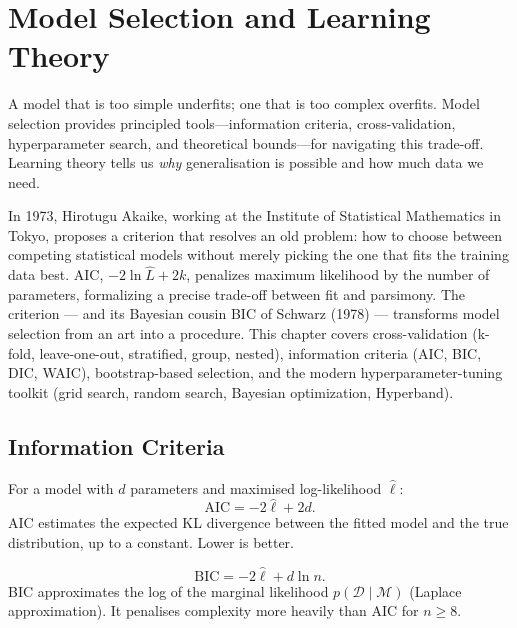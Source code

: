 \chapter{Model Selection and Learning Theory}
\label{ch:selection}

\begin{intuition}[title=\textbf{Choosing the Right Model}]
A model that is too simple underfits; one that is too complex overfits. Model selection provides principled tools---information criteria, cross-validation, hyperparameter search, and theoretical bounds---for navigating this trade-off. Learning theory tells us \emph{why} generalisation is possible and how much data we need.
\end{intuition}

In 1973, Hirotugu Akaike, working at the Institute of Statistical Mathematics in Tokyo, proposes a criterion that resolves an old problem: how to choose between competing statistical models without merely picking the one that fits the training data best. AIC, $-2 \ln \hat L + 2k$, penalizes maximum likelihood by the number of parameters, formalizing a precise trade-off between fit and parsimony. The criterion --- and its Bayesian cousin BIC of Schwarz (1978) --- transforms model selection from an art into a procedure. This chapter covers cross-validation (k-fold, leave-one-out, stratified, group, nested), information criteria (AIC, BIC, DIC, WAIC), bootstrap-based selection, and the modern hyperparameter-tuning toolkit (grid search, random search, Bayesian optimization, Hyperband).

\section{Information Criteria}

\begin{definition}
For a model with $d$ parameters and maximised log-likelihood $\hat\ell$:
\[
  \text{AIC} = -2\hat\ell + 2d.
\]
AIC estimates the expected KL divergence between the fitted model and the true distribution, up to a constant. Lower is better.
\end{definition}

\begin{definition}
\[
  \text{BIC} = -2\hat\ell + d\ln n.
\]
BIC approximates the log of the marginal likelihood $p(\mathcal{D}\mid\mathcal{M})$ (Laplace approximation). It penalises complexity more heavily than AIC for $n\geq 8$.
\end{definition}

